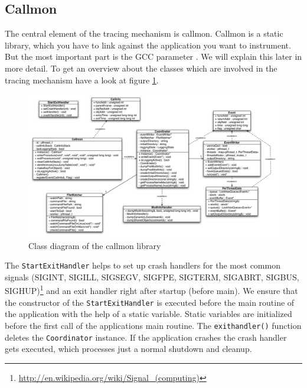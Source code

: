 \subsection{Callmon}

The central element of the tracing mechanism is callmon. Callmon is a static library, which you have to link against the application you want to instrument. But the most important part is the GCC parameter . We will explain this later in more detail. To get an overview about the classes which are involved in the tracing mechanism have a look at figure \ref{fig:unixfe_figure1}.

\begin{figure}[ht]
\centering
\includegraphics[width=16cm]{images/callmon_class_diagram}
\caption{Class diagram of the callmon library}\label{fig:unixfe_figure1}
\end{figure}

The \verb=StartExitHandler=  helps to set up crash handlers for the most common signals (SIGINT, SIGILL, SIGSEGV, SIGFPE, SIGTERM, SIGABRT, SIGBUS, SIGHUP)\footnote{\url{http://en.wikipedia.org/wiki/Signal_(computing)}} and an exit handler right after startup (before main). We ensure that the constructor of the \verb=StartExitHandler= is executed before the main routine of the application with the help of a static variable. Static variables are initialized before the first call of the applications main routine. The \verb=exithandler()= function deletes the \verb=Coordinator= instance. If the application crashes the crash handler gets executed, which processes just a normal shutdown and cleanup.

